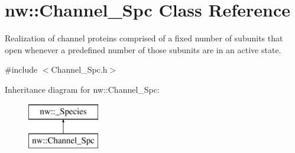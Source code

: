 \hypertarget{classnw_1_1_channel___spc}{\section{nw\+:\+:Channel\+\_\+\+Spc Class Reference}
\label{classnw_1_1_channel___spc}
}


Realization of channel proteins comprised of a fixed number of subunits that open whenever a predefined number of those subunits are in an active state.  




{\ttfamily \#include $<$Channel\+\_\+\+Spc.\+h$>$}

Inheritance diagram for nw\+:\+:Channel\+\_\+\+Spc\+:\begin{figure}[H]
\begin{center}
\leavevmode
\includegraphics[height=2.000000cm]{db/dde/classnw_1_1_channel___spc}
\end{center}
\end{figure}
